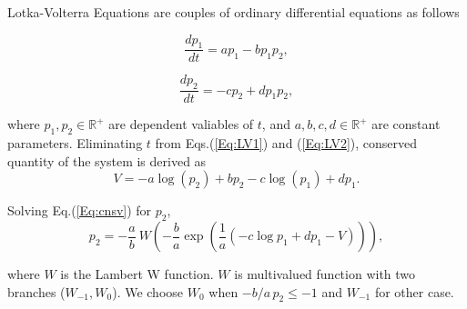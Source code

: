 \documentclass[a4j]{article}
\begin{document}
    Lotka-Volterra Equations\cite{wikilv, wollv} are couples of ordinary differential equations as follows

    \begin{equation}
        \label{Eq:LV1}
        \frac{dp_1}{dt} = a p_1 -b p_1 p_2, 
    \end{equation}

    \begin{equation}
        \label{Eq:LV2}
        \frac{dp_2}{dt} = -c p_2 + d p_1 p_2, 
    \end{equation}

    where $p_1, p_2 \in \mathbb{R}^+ $ are dependent valiables of $t$, and $a, b, c, d \in \mathbb{R}^+ $ are constant parameters. Eliminating $t$ from Eqs.(\ref{Eq:LV1}) and (\ref{Eq:LV2}), conserved quantity of the system is derived as 
    \begin{equation}
        \label{Eq:cnsv}
        V = -a \log(p_2) + b p_2 -c \log(p_1) + d p_1.
    \end{equation}

    Solving Eq.(\ref{Eq:cnsv}) for $p_2$,  
    \begin{equation}
        p_2 = -\frac{a}{b} \:
            W \left( -\frac{b}{a} \exp \left(
            \frac{1}{a} \left(-c \log p_1 + d p_1 -V 
            \right) \right) \right),
    \end{equation}

    where $W$ is the Lambert W function\cite{wikilam}. 
    $W$ is multivalued function with two branches ($W_{-1}, W_{0}$). 
    We choose $ W_0 $ when $ -b/a \, p_2 \leq -1 $ and $W_{-1}$ for other case.

    
\end{document}
